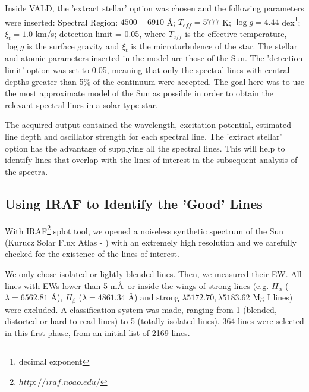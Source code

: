 \documentclass[dvips,12pt,a4paper]{report}
\begin{document}
{Inside VALD, the 'extract stellar' option was chosen and the following parameters were inserted: Spectral Region: $4500-6910$ \AA ; $T_{eff}=5777$ K; $\log g=4.44$ dex\footnote{decimal exponent}; $\xi_t=1.0$ km/s; detection limit = 0.05, where $T_{eff}$ is the effective temperature, $\log g$ is the surface gravity and $\xi_t$ is the microturbulence of the star. The stellar and atomic parameters inserted in the model are those of the Sun. The 'detection limit' option was set to 0.05, meaning that only the spectral lines with central depths greater than 5\% of the continuum were accepted. The goal here was to use the most approximate model of the Sun as possible in order to obtain the relevant spectral lines in a solar type star.

The acquired output contained the wavelength, excitation potential, estimated line depth and oscillator strength for each spectral line. The 'extract stellar' option has the advantage of supplying all the spectral lines. This will help to identify lines that overlap with the lines of interest in the subsequent analysis of the spectra.


\subsection {Using IRAF to Identify the 'Good' Lines}
\label{idiraf}
With IRAF\footnote{$http://iraf.noao.edu/$} splot tool, we opened a noiseless synthetic spectrum of the Sun (Kurucz Solar Flux Atlas - \citet{Kurucz-1984} ) with an extremely high resolution and we carefully checked for the existence of the lines of interest.

We only chose isolated or lightly blended lines. Then, we measured their EW. All lines with EWs lower than 5 m\AA\, or inside the wings of strong lines (e.g. $H_\alpha$ ($\lambda=6562.81$ \AA), $H_\beta$ ($\lambda=4861.34$ \AA) and strong $\lambda5172.70,\lambda5183.62$ Mg I lines) were excluded. %
A classification system was made, ranging from 1 (blended, distorted or hard to read lines) to 5 (totally isolated lines). 364 lines were selected in this first phase, from an initial list of 2169 lines.

}
\end{document}
